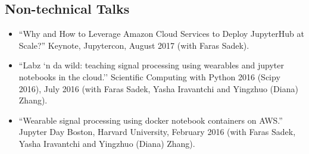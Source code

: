 \begin{itemize}
%
%
\end{itemize}

\subsection*{Non-technical Talks}

\begin{itemize}
	\item ``Why and How to Leverage Amazon Cloud Services to Deploy JupyterHub at Scale?'' Keynote, Jupytercon, August 2017 (with Faras Sadek).
    \item ``Labz `n da wild: teaching signal processing using wearables and jupyter notebooks in the cloud.'' Scientific Computing with Python 2016 (Scipy 2016), July 2016 (with Faras Sadek, Yasha Iravantchi and Yingzhuo (Diana) Zhang).
    \item ``Wearable signal processing using docker notebook containers on AWS.'' Jupyter Day Boston, Harvard University, February 2016 (with Faras Sadek, Yasha Iravantchi and Yingzhuo (Diana) Zhang).
\end{itemize}


